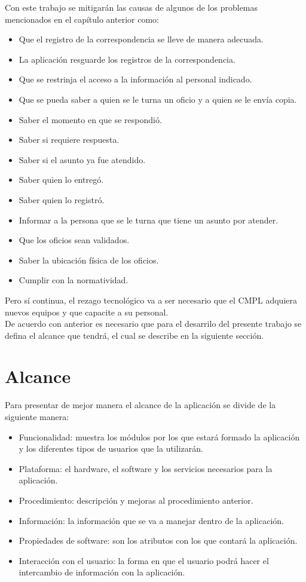 Con este trabajo se mitigarán las causas de algunos de los problemas mencionados en el capítulo anterior como: 
\begin{itemize}
	\item Que el registro de la correspondencia se lleve de manera adecuada.
	\item La aplicación resguarde los registros de la correspondencia.
	\item Que se restrinja el acceso a la información al personal indicado.
	\item Que se pueda saber a quien se le turna un oficio y a quien se le envía copia.
	\item Saber el momento en que se respondió.
	\item Saber si requiere respuesta.
	\item Saber si el asunto ya fue atendido. 
	\item Saber quien lo entregó.
	\item Saber quien lo registró.
	\item Informar a la persona que se le turna que tiene un asunto por atender.
	\item Que los oficios sean validados.
	\item Saber la ubicación física de los oficios. 
	\item Cumplir con la normatividad.
\end{itemize}  
Pero sí continua, el rezago tecnológico va a ser necesario que el CMPL adquiera nuevos equipos y que capacite a su personal. \\

De acuerdo con anterior es necesario que para el desarrilo del presente trabajo se defina el alcance que tendrá, el cual se describe en la siguiente sección. 

\section{Alcance}

Para presentar de mejor manera el alcance de la aplicación se divide de la siguiente manera: \\

\begin{itemize}
	\item Funcionalidad: muestra los módulos por los que estará formado la aplicación y los diferentes tipos de usuarios que la utilizarán.
	\item Plataforma: el hardware, el software y los servicios necesarios para la aplicación. 
	\item Procedimiento: descripción y mejoras al procedimiento anterior.
	\item Información: la información que se va a manejar dentro de la aplicación.
	\item Propiedades de software: son los atributos con los que contará la aplicación.
	\item Interacción con el usuario: la forma en que el usuario podrá hacer el intercambio de información con la aplicación.
\end{itemize}

